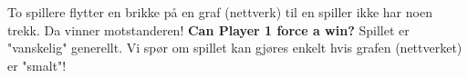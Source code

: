 To spillere flytter en brikke på en graf (nettverk) til 
en spiller ikke har noen trekk. Da vinner motstanderen!
\PosterPara
\textbf{Can Player 1 force a win?}
\PosterPara
Spillet er "vanskelig" generellt. Vi spør om spillet 
kan gjøres enkelt hvis grafen (nettverket) er "smalt"!
